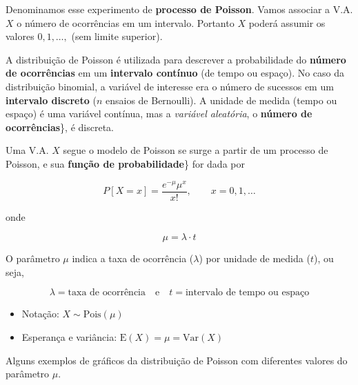 \documentclass[10pt,a4paper]{book}
\providecommand{\tightlist}{%
  \setlength{\itemsep}{0pt}\setlength{\parskip}{0pt}}
\begin{document}
Denominamos esse experimento de \textbf{processo de Poisson}. Vamos
associar a V.A. \(X\) o número de ocorrências em um intervalo. Portanto
\(X\) poderá assumir os valores \(0, 1, \ldots,\) (sem limite superior).

A distribuição de Poisson é utilizada para descrever a probabilidade do
\textbf{número de ocorrências} em um \textbf{intervalo contínuo} (de
tempo ou espaço). No caso da distribuição binomial, a variável de
interesse era o número de sucessos em um \textbf{intervalo discreto}
(\(n\) ensaios de Bernoulli). A unidade de medida (tempo ou espaço) é
uma variável contínua, mas a \emph{variável aleatória}, o \textbf{número
de ocorrências}\}, é discreta.

Uma V.A. \(X\) segue o modelo de Poisson se surge a partir de um
processo de Poisson, e sua \textbf{função de probabilidade}\} for dada
por

\[
    P[X = x] = \frac{e^{-\mu} \mu^x}{x!}, \quad \quad x = 0, 1, \ldots
\]

onde

\[
    \mu = \lambda \cdot t
\]

O parâmetro \(\mu\) indica a taxa de ocorrência (\(\lambda\)) por
unidade de medida (\(t\)), ou seja,

\[
    \lambda = \text{taxa de ocorrência} \quad \text{e} \quad t =
    \text{intervalo de tempo ou espaço}
\]

\begin{itemize}
\tightlist
\item
  Notação: \(X \sim \text{Pois}(\mu)\)
\item
  Esperança e variância: \(\text{E}(X) = \mu = \text{Var}(X)\)
\end{itemize}

Alguns exemplos de gráficos da distribuição de Poisson com diferentes
valores do parâmetro \(\mu\).
\end{document}
